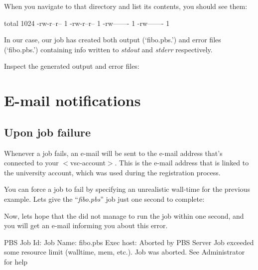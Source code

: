 When you navigate to that directory and list its contents, you should see them:

\begin{prompt}
total 1024
-rw-r--r-- 1 %
-rw-r--r-- 1 %
-rw------- 1 %
-rw------- 1 %
\end{prompt}

In our case, our job has created both output (`fibo.pbs.\jobnumber') and
error files (`fibo.pbs.\jobnumber') containing info written to
\emph{stdout} and \emph{stderr} respectively.

Inspect the generated output and error files:

\begin{prompt}
\end{prompt}

\section{E-mail notifications}

\ifgent
\else
  \subsection{Upon job failure}

  Whenever a job fails, an e-mail will be sent to the e-mail address that's
  connected to your $<$vsc-account$>$. This is the e-mail address that is linked
  to the university account, which was used during the registration process.

  You can force a job to fail by specifying an unrealistic wall-time for the
  previous example.  Lets give the ``\emph{fibo.pbs}'' job just one second to
  complete:

\begin{prompt}
\end{prompt}

  Now, lets hope that the \hpc did not manage to run the job within one second,
  and you will get an e-mail informing you about this error.

  \begin{flattext}
  PBS Job Id: %
  Job Name:   fibo.pbs
  Exec host:  %
  Aborted by PBS Server
  Job exceeded some resource limit (walltime, mem, etc.). Job was aborted.
  See Administrator for help
  \end{flattext}
\fi

